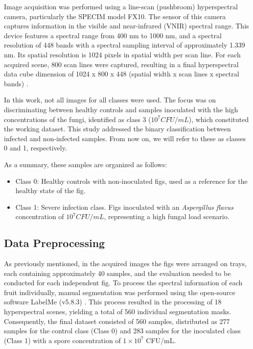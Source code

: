 \documentclass[runningheads]{llncs}
\begin{document}
Image acquisition was performed using a line-scan (pushbroom) hyperspectral camera, particularly the SPECIM model FX10.
The sensor of this camera captures information in the visible and near-infrared (VNIR) spectral range. 
This device features a spectral range from 400 nm to 1000 nm, and a spectral resolution of 448 bands with a spectral sampling interval of approximately 1.339 nm. 
Its spatial resolution is 1024 pixels in spatial width per scan line. For each acquired scene, 800 scan lines were captured, resulting in a final hyperspectral data cube dimension of 1024 x 800 x 448 (spatial width x scan lines x spectral bands) \cite{specim_specim_2020}.

In this work, not all images for all classes were used. The focus was on discriminating between healthy controls and samples inoculated with the high concentrations of the fungi, identified as class 3 ($10^7 CFU/mL$), which constituted the working dataset. This study addressed the binary classification between infected and non-infected samples. From now on, we will refer to these as classes 0 and 1, respectively.

As a summary, these samples are organized as follows:

\begin{itemize}
    \item Class 0: Healthy controls with non-inoculated figs, used as a reference for the healthy state of the fig.
    \item Class 1: Severe infection class. Figs inoculated with an \textit{Aspergillus flavus} concentration of $10^7 CFU/mL$, representing a high fungal load scenario.
\end{itemize}

\subsection{Data Preprocessing}
As previously mentioned, in the acquired images the figs were arranged on trays, each containing approximately 40 samples, and the evaluation needed to be conducted for each independent fig.  
To process the spectral information of each fruit individually, manual segmentation was performed using the open-source software LabelMe (v5.8.3) \cite{wada_wkentarolabelme_2021}. 
This process resulted in the processing of 18 hyperspectral scenes, yielding a total of 560 individual segmentation masks. 
Consequently, the final dataset consisted of 560 samples, distributed as 277 samples for the control class (Class 0) and 283 samples for the inoculated class (Class 1) with a spore concentration of $1\times10^7$ CFU/mL.
\end{document}
